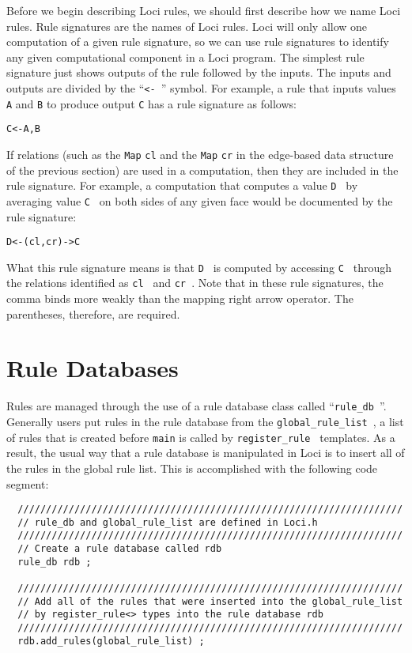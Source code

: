 \documentclass[10pt,epsf]{book}
\begin{document}
Before we begin describing Loci rules, we should first describe how we
name Loci rules.  Rule signatures are the names of Loci rules.  Loci
will only allow one computation of a given rule signature, so we can
use rule signatures to identify any given computational component in a
Loci program.  The simplest rule signature just shows outputs of the
rule followed by the inputs.  The inputs and outputs are divided by
the ``{\tt <- }'' symbol.  For example, a rule that inputs values {\tt
  A} and {\tt B} to produce output {\tt C} has a rule signature as
follows:

\begin{verbatim}
C<-A,B
\end{verbatim}

If relations (such as the {\tt Map} {\tt cl}
and the {\tt Map} {\tt cr} in the edge-based data structure of the
previous section) are used in a computation, then they are included 
in the rule signature.
For example, a computation that computes a value {\tt D }
by averaging value {\tt C } on both sides of any given face would
be documented by the rule signature:

\begin{verbatim}
D<-(cl,cr)->C
\end{verbatim}

What this rule signature means is that {\tt D } is computed by
accessing {\tt C } through the relations identified as 
{\tt cl } and {\tt cr }.  Note that in these rule signatures, 
the comma binds more weakly than
the mapping right arrow operator.  The
parentheses, therefore, are required.

\section{Rule Databases}

Rules are managed through the use of a rule database class called
``{\tt rule\_db }''.  Generally users put rules in the rule database
from the {\tt global\_rule\_list }, a list of rules that is created
before {\tt main} is called by {\tt register\_rule } templates.  As a
result, the usual way that a rule database is manipulated in Loci is
to insert all of the rules in the global rule list.  This is
accomplished with the following code segment: 

\begin{verbatim}
  ////////////////////////////////////////////////////////////////////
  // rule_db and global_rule_list are defined in Loci.h
  ////////////////////////////////////////////////////////////////////
  // Create a rule database called rdb
  rule_db rdb ;

  ////////////////////////////////////////////////////////////////////
  // Add all of the rules that were inserted into the global_rule_list
  // by register_rule<> types into the rule database rdb
  ////////////////////////////////////////////////////////////////////
  rdb.add_rules(global_rule_list) ;
\end{verbatim}
\end{document}
